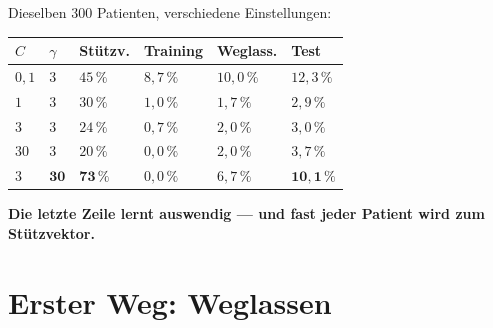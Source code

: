 \begin{merksatz}
Dieselben $300$ Patienten, verschiedene Einstellungen:

\begin{center}
{\small
\renewcommand{\arraystretch}{1.46}
\begin{tabular}{@{}P{1.0cm}P{1.0cm}P{1.4cm}P{1.6cm}P{1.4cm}P{1.4cm}@{}}
\toprule
$C$ & $\gamma$ & \textbf{Stützv.} & \textbf{Training} & \textbf{Weglass.} & \textbf{Test}\\
\midrule
$0{,}1$ & $3$ & $45\,\%$ & $8{,}7\,\%$ & $10{,}0\,\%$ & $12{,}3\,\%$\\
$1$ & $3$ & $30\,\%$ & $1{,}0\,\%$ & $1{,}7\,\%$ & $2{,}9\,\%$\\
$3$ & $3$ & $24\,\%$ & $0{,}7\,\%$ & $2{,}0\,\%$ & $3{,}0\,\%$\\
$30$ & $3$ & $20\,\%$ & $0{,}0\,\%$ & $2{,}0\,\%$ & $3{,}7\,\%$\\
$3$ & $\mathbf{30}$ & $\mathbf{73\,\%}$ & $0{,}0\,\%$ & $6{,}7\,\%$ & $\mathbf{10{,}1\,\%}$\\
\bottomrule
\end{tabular}}
\end{center}

\begin{center}
\begin{minipage}{0.9\textwidth}
\textbf{Die letzte Zeile lernt auswendig --- und fast jeder Patient wird zum Stützvektor.}
\end{minipage}
\end{center}

\begin{center}
\begin{minipage}{0.88\textwidth}
\end{minipage}
\end{center}
\end{merksatz}

\section{Erster Weg: Weglassen}

